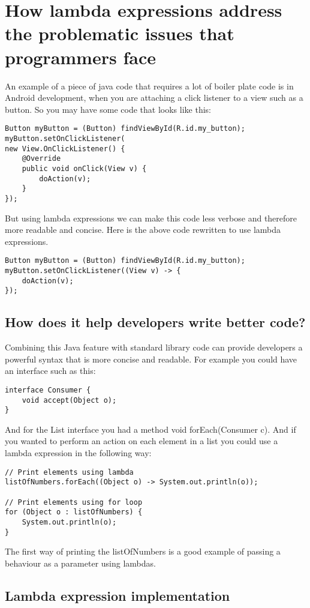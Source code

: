 \documentclass[twocolumn,notitlepage]{report}
\begin{document}
\section*{How lambda expressions address the problematic issues that programmers face}
An example of a piece of java code that requires a lot of boiler plate code is
in Android development, when you are attaching a click listener to a view such
as a button. So you may have some code that looks like this:
\begin{lstlisting}
Button myButton = (Button) findViewById(R.id.my_button);
myButton.setOnClickListener(
new View.OnClickListener() {
	@Override
	public void onClick(View v) {
		doAction(v);
	}
});
\end{lstlisting}
But using lambda expressions we can make this code less verbose and therefore
more readable and concise. Here is the above code rewritten to use lambda
expressions.
\newpage
\begin{lstlisting}
Button myButton = (Button) findViewById(R.id.my_button);
myButton.setOnClickListener((View v) -> {
	doAction(v);
});
\end{lstlisting}

\subsection*{How does it help developers write better code?}
Combining this Java feature with standard library code can provide developers a powerful syntax 
that is more concise and readable. For example you could have an interface such as this:
\begin{lstlisting}
interface Consumer {
	void accept(Object o);
}
\end{lstlisting}
And for the {\ttfamily List} interface you had a method {\ttfamily void
forEach(Consumer c)}.  And if you wanted to perform an action on each element
in a list you could use a lambda expression in the following way:
\begin{lstlisting}
// Print elements using lambda
listOfNumbers.forEach((Object o) -> System.out.println(o));

// Print elements using for loop
for (Object o : listOfNumbers) {
	System.out.println(o);
}
\end{lstlisting}
The first way of printing the listOfNumbers is a good example of passing a
behaviour as a parameter using lambdas.
\cite{website:why-we-need-lambda-expressions-in-java}


\subsection*{Lambda expression implementation}
\end{document}
